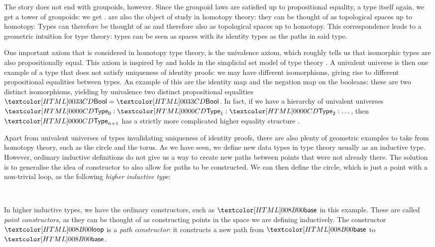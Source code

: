 The story does not end with groupoids, however. Since the groupoid
laws are satisfied up to propositional equality, a type itself again,
we get a tower of groupoids: we get \inftygrpds. \inftygrpds are also
the object of study in homotopy theory: they can be thought of as
topological spaces up to homotopy. Types can therefore be thought of
as \inftygrpds \cite{VanDenBerg2011,Lumsdaine2009} and therefore also
as topological spaces up to homotopy. This correspondence leads to a
geometric intuition for type theory: types can be seen as spaces with
its identity types as the paths in said type.

One important axiom that is considered in homotopy type theory, is the
univalence axiom, which roughly tells us that isomorphic types are
also propositionally equal. This axiom is inspired by and holds in the
simplicial set model of type theory \cite{Kapulkin2012}. A univalent
universe is then one example of a type that does not satisfy
uniqueness of identity proofs: we may have different isomorphisms,
giving rise to different propositional equalities between types. An
example of this are the identity map and the negation map on the
booleans: these are two distinct isomorphisms, yielding by univalence
two distinct propositional equalities $\boolty = \boolty$. In fact, if
we have a hierarchy of univalent universes
$\Type_0 : \Type_1 : \Type_2 : \hdots$, then $\Type_{n+1}$ has a
strictly more complicated higher equality structure
\cite{Kraus2015ii}.

Apart from univalent universes of types invalidating uniqueness of
identity proofs, there are also plenty of geometric examples to take
from homotopy theory, such as the circle and the torus. As we have
seen, we define new data types in type theory usually as an inductive
type. However, ordinary inductive definitions do not give us a way to
create new paths between points that were not already there. The
solution is to generalise the idea of constructor to also allow for
paths to be constructed. We can then define the circle, which is just
a point with a non-trivial loop, as the following \emph{higher
  inductive type}:
\begin{datatype}{\circlety}{\Type}
  \constr{\circlebase}{\circlety} \\
  \constr{\circleloop}{\circlebase = \circlebase}
\end{datatype}
In higher inductive types, we have the ordinary constructors, such as
$\circlebase$ in this example. These are called \emph{point
  constructors}, as they can be thought of as constructing points in
the space we are defining inductively. The constructor $\circleloop$
is a \emph{path constructor}: it constructs a new path from
$\circlebase$ to $\circlebase$.

